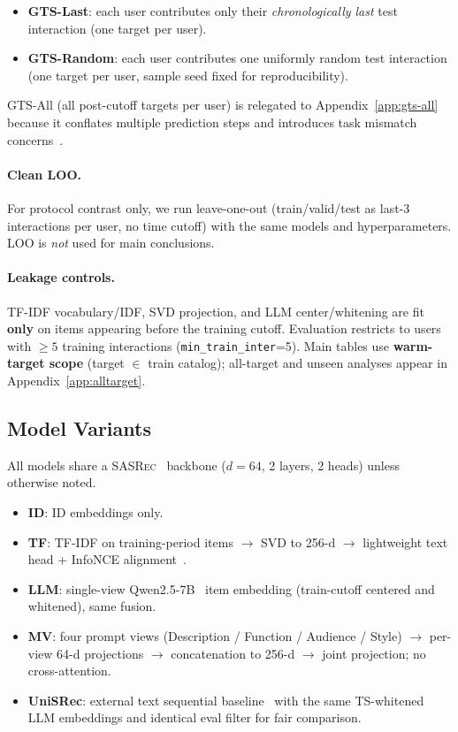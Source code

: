 \documentclass[sigconf,natbib=true,anonymous]{acmart}
\newcommand{\tfidf}{\textsc{TF-IDF}\xspace}
\newcommand{\base}{\textsc{SASRec}\xspace}
\begin{document}
\begin{itemize}[leftmargin=*,itemsep=1pt]
\item \textbf{GTS-Last}: each user contributes only their \emph{chronologically last} test interaction (one target per user).
\item \textbf{GTS-Random}: each user contributes one uniformly random test interaction (one target per user, sample seed fixed for reproducibility).
\end{itemize}

GTS-All (all post-cutoff targets per user) is relegated to Appendix~\ref{app:gts-all} because it conflates multiple prediction steps and introduces task mismatch concerns~\cite{hidasi2018recurrent}.

\paragraph{Clean LOO.}
For protocol contrast only, we run leave-one-out (train/valid/test as last-3 interactions per user, no time cutoff) with the same models and hyperparameters.
LOO is \emph{not} used for main conclusions.

\paragraph{Leakage controls.}
\tfidf vocabulary/IDF, SVD projection, and LLM center/whitening are fit \textbf{only} on items appearing before the training cutoff.
Evaluation restricts to users with $\ge 5$ training interactions (\texttt{min\_train\_inter}=5).
Main tables use \textbf{warm-target scope} (target $\in$ train catalog); all-target and unseen analyses appear in Appendix~\ref{app:alltarget}.

\subsection{Model Variants}
\label{sec:models}

All models share a \base~\cite{kang2018sasrec} backbone ($d{=}64$, 2 layers, 2 heads) unless otherwise noted.

\begin{itemize}[leftmargin=*,itemsep=1pt]
\item \textbf{ID}: ID embeddings only.
\item \textbf{TF}: \tfidf on training-period items $\rightarrow$ SVD to 256-d $\rightarrow$ lightweight text head + InfoNCE alignment~\cite{oord2018cpc}.
\item \textbf{LLM}: single-view Qwen2.5-7B~\cite{qwen2024qwen25} item embedding (train-cutoff centered and whitened), same fusion.
\item \textbf{MV}: four prompt views (Description / Function / Audience / Style) $\rightarrow$ per-view 64-d projections $\rightarrow$ concatenation to 256-d $\rightarrow$ joint projection; no cross-attention.
\item \textbf{UniSRec}: external text sequential baseline~\cite{hou2022unisrec} with the same TS-whitened LLM embeddings and identical eval filter for fair comparison.
\end{itemize}
\end{document}
